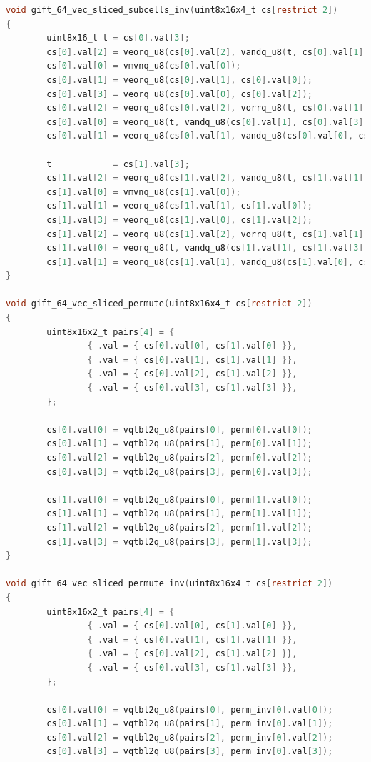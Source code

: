 \documentclass[12pt]{report}
\begin{document}
\begin{lstlisting}[language=c, caption={gift\_vec\_sliced.c}]
void gift_64_vec_sliced_subcells_inv(uint8x16x4_t cs[restrict 2])
{
        uint8x16_t t = cs[0].val[3];
        cs[0].val[2] = veorq_u8(cs[0].val[2], vandq_u8(t, cs[0].val[1]));
        cs[0].val[0] = vmvnq_u8(cs[0].val[0]);
        cs[0].val[1] = veorq_u8(cs[0].val[1], cs[0].val[0]);
        cs[0].val[3] = veorq_u8(cs[0].val[0], cs[0].val[2]);
        cs[0].val[2] = veorq_u8(cs[0].val[2], vorrq_u8(t, cs[0].val[1]));
        cs[0].val[0] = veorq_u8(t, vandq_u8(cs[0].val[1], cs[0].val[3]));
        cs[0].val[1] = veorq_u8(cs[0].val[1], vandq_u8(cs[0].val[0], cs[0].val[2]));

        t            = cs[1].val[3];
        cs[1].val[2] = veorq_u8(cs[1].val[2], vandq_u8(t, cs[1].val[1]));
        cs[1].val[0] = vmvnq_u8(cs[1].val[0]);
        cs[1].val[1] = veorq_u8(cs[1].val[1], cs[1].val[0]);
        cs[1].val[3] = veorq_u8(cs[1].val[0], cs[1].val[2]);
        cs[1].val[2] = veorq_u8(cs[1].val[2], vorrq_u8(t, cs[1].val[1]));
        cs[1].val[0] = veorq_u8(t, vandq_u8(cs[1].val[1], cs[1].val[3]));
        cs[1].val[1] = veorq_u8(cs[1].val[1], vandq_u8(cs[1].val[0], cs[1].val[2]));
}

void gift_64_vec_sliced_permute(uint8x16x4_t cs[restrict 2])
{
        uint8x16x2_t pairs[4] = {
                { .val = { cs[0].val[0], cs[1].val[0] }},
                { .val = { cs[0].val[1], cs[1].val[1] }},
                { .val = { cs[0].val[2], cs[1].val[2] }},
                { .val = { cs[0].val[3], cs[1].val[3] }},
        };

        cs[0].val[0] = vqtbl2q_u8(pairs[0], perm[0].val[0]);
        cs[0].val[1] = vqtbl2q_u8(pairs[1], perm[0].val[1]);
        cs[0].val[2] = vqtbl2q_u8(pairs[2], perm[0].val[2]);
        cs[0].val[3] = vqtbl2q_u8(pairs[3], perm[0].val[3]);

        cs[1].val[0] = vqtbl2q_u8(pairs[0], perm[1].val[0]);
        cs[1].val[1] = vqtbl2q_u8(pairs[1], perm[1].val[1]);
        cs[1].val[2] = vqtbl2q_u8(pairs[2], perm[1].val[2]);
        cs[1].val[3] = vqtbl2q_u8(pairs[3], perm[1].val[3]);
}

void gift_64_vec_sliced_permute_inv(uint8x16x4_t cs[restrict 2])
{
        uint8x16x2_t pairs[4] = {
                { .val = { cs[0].val[0], cs[1].val[0] }},
                { .val = { cs[0].val[1], cs[1].val[1] }},
                { .val = { cs[0].val[2], cs[1].val[2] }},
                { .val = { cs[0].val[3], cs[1].val[3] }},
        };

        cs[0].val[0] = vqtbl2q_u8(pairs[0], perm_inv[0].val[0]);
        cs[0].val[1] = vqtbl2q_u8(pairs[1], perm_inv[0].val[1]);
        cs[0].val[2] = vqtbl2q_u8(pairs[2], perm_inv[0].val[2]);
        cs[0].val[3] = vqtbl2q_u8(pairs[3], perm_inv[0].val[3]);


\end{lstlisting}
\end{document}
